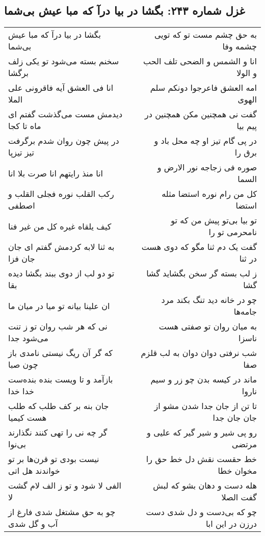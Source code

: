 \begin{center}
\section*{غزل شماره ۲۴۳: بگشا در بیا درآ که مبا عیش بی‌شما}
\label{sec:0243}
\begin{longtable}{l p{0.5cm} r}
بگشا در بیا درآ که مبا عیش بی‌شما
&&
به حق چشم مست تو که تویی چشمه وفا
\\
سخنم بسته می‌شود تو یکی زلف برگشا
&&
انا و الشمس و الضحی تلف الحب و الولا
\\
انا فی العشق آیه فاقرونی علی الملا
&&
امه العشق فاعرجوا دونکم سلم الهوی
\\
دیدمش مست می‌گذشت گفتم ای ماه تا کجا
&&
گفت نی همچنین مکن همچنین در پیم بیا
\\
در پیش چون روان شدم برگرفت تیز تیزپا
&&
در پی گام تیز او چه محل باد و برق را
\\
انا منذ رایتهم انا صرت بلا انا
&&
صوره فی زجاجه نور الارض و السما
\\
رکب القلب نوره فجلی القلب و اصطفی
&&
کل من رام نوره استضا مثله استضا
\\
کیف یلقاه غیره کل من غیر فنا
&&
تو بیا بی‌تو پیش من که تو نامحرمی تو را
\\
به ثنا لابه کردمش گفتم ای جان جان فزا
&&
گفت یک دم ثنا مگو که دوی هست در ثنا
\\
تو دو لب از دوی ببند بگشا دیده بقا
&&
ز لب بسته گر سخن بگشاید گشا گشا
\\
ان علینا بیانه تو میا در میان ما
&&
چو در خانه دید تنگ بکند مرد جامه‌ها
\\
نی که هر شب روان تو ز تنت می‌شود جدا
&&
به میان روان تو صفتی هست ناسزا
\\
که گر آن ریگ نیستی نامدی باز چون صبا
&&
شب نرفتی دوان دوان به لب قلزم صفا
\\
بازآمد و تا ویست بنده بنده‌ست خدا خدا
&&
ماند در کیسه بدن چو زر و سیم ناروا
\\
جان بنه بر کف طلب که طلب هست کیمیا
&&
تا تن از جان جدا شدن مشو از جان جان جدا
\\
گر چه نی را تهی کنند نگذارند بی‌نوا
&&
رو پی شیر و شیر گیر که علیی و مرتضی
\\
نیست بودی تو قرن‌ها بر تو خواندند هل اتی
&&
خط حقست نقش دل خط حق را مخوان خطا
\\
الفی لا شود و تو ز الف لام گشت لا
&&
هله دست و دهان بشو که لبش گفت الصلا
\\
چو به حق مشتغل شدی فارغ از آب و گل شدی
&&
چو که بی‌دست و دل شدی دست درزن در این ابا
\\
\end{longtable}
\end{center}
